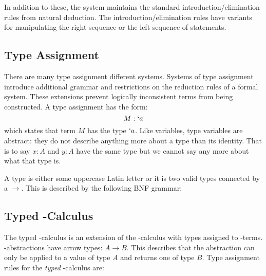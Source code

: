   In addition to these, the system maintains the standard introduction/elimination rules from natural deduction.
  The introduction/elimination rules have variants for manipulating the right sequence or the left sequence of statements.
  
  \subsection{Type Assignment}\label{sec:type-assignment}
  
  There are many type assignment different systems.
  Systems of type assignment introduce additional grammar and restrictions on the reduction rules of a formal system. 
  These extensions prevent logically inconsistent terms from being constructed. 
  A type assignment has the form:
  \[
    M : `a 
  \]
  which states that term $M$ has the type $`a$. 
  Like variables, type variables are abstract: 
  they do not describe anything more about a type than its identity. 
  That is to say $x: A$ and $y : A$ have the same type but we cannot say any more about what that type is.
 
  A type is either some uppercase Latin letter or it is two valid types connected by a $\rightarrow$. 
  This is described by the following BNF grammar:
  
  
  \subsection{Typed \lam-Calculus}
  The typed \lam-calculus is an extension of the \lam-calculus with types assigned to \lam-terms.
  \lam-abstractions have arrow types: $A \to B$.
  This describes that the abstraction can only be applied to a value of type $A$ and returns one of type $B$.
  Type assignment rules for the \emph{typed} \lam-calculus are:

